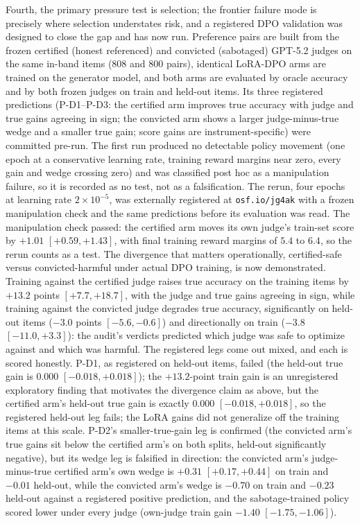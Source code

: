 Fourth, the primary pressure test is selection; the frontier failure mode is precisely where selection understates risk, and a registered DPO validation was designed to close the gap and has now run.
Preference pairs are built from the frozen certified (honest referenced) and convicted (sabotaged) GPT-5.2 judges on the same in-band items (808 and 800 pairs), identical LoRA-DPO arms are trained on the generator model, and both arms are evaluated by oracle accuracy and by both frozen judges on train and held-out items.
Its three registered predictions (P-D1--P-D3: the certified arm improves true accuracy with judge and true gains agreeing in sign; the convicted arm shows a larger judge-minus-true wedge and a smaller true gain; score gains are instrument-specific) were committed pre-run.
The first run produced no detectable policy movement (one epoch at a conservative learning rate, training reward margins near zero, every gain and wedge crossing zero) and was classified post hoc as a manipulation failure, so it is recorded as no test, not as a falsification.
The rerun, four epochs at learning rate $2 \times 10^{-5}$, was externally registered at \texttt{osf.io/jg4ak} with a frozen manipulation check and the same predictions before its evaluation was read.
The manipulation check passed: the certified arm moves its own judge's train-set score by $+1.01$ $[+0.59, +1.43]$, with final training reward margins of $5.4$ to $6.4$, so the rerun counts as a test.
The divergence that matters operationally, certified-safe versus convicted-harmful under actual DPO training, is now demonstrated.
Training against the certified judge raises true accuracy on the training items by $+13.2$ points $[+7.7, +18.7]$, with the judge and true gains agreeing in sign, while training against the convicted judge degrades true accuracy, significantly on held-out items ($-3.0$ points $[-5.6, -0.6]$) and directionally on train ($-3.8$ $[-11.0, +3.3]$): the audit's verdicts predicted which judge was safe to optimize against and which was harmful.
The registered legs come out mixed, and each is scored honestly.
P-D1, as registered on held-out items, failed (the held-out true gain is $0.000$ $[-0.018, +0.018]$); the $+13.2$-point train gain is an unregistered exploratory finding that motivates the divergence claim as above, but the certified arm's held-out true gain is exactly $0.000$ $[-0.018, +0.018]$, so the registered held-out leg fails; the LoRA gains did not generalize off the training items at this scale.
P-D2's smaller-true-gain leg is confirmed (the convicted arm's true gains sit below the certified arm's on both splits, held-out significantly negative), but its wedge leg is falsified in direction: the convicted arm's judge-minus-true certified arm's own wedge is $+0.31$ $[+0.17, +0.44]$ on train and $-0.01$ held-out, while the convicted arm's wedge is $-0.70$ on train and $-0.23$ held-out against a registered positive prediction, and the sabotage-trained policy scored lower under every judge (own-judge train gain $-1.40$ $[-1.75, -1.06]$).
